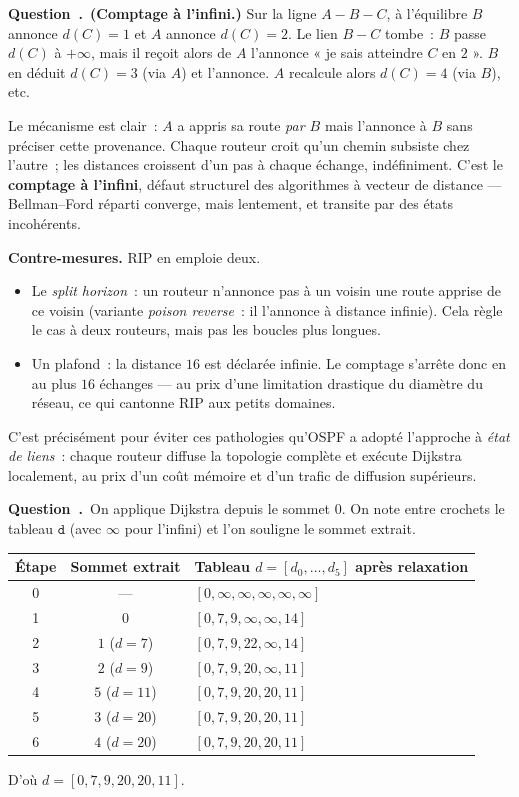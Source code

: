 \documentclass[11pt,a4paper]{article}
\renewcommand{\Q}{\medskip\par\stepcounter{qcnt}\noindent\textbf{\color{cnc}Question~\theqcnt.}~}
\begin{document}
\Q \textbf{(Comptage à l'infini.)} Sur la ligne $A - B - C$, à l'équilibre $B$ annonce
$d(C)=1$ et $A$ annonce $d(C)=2$. Le lien $B-C$ tombe~: $B$ passe $d(C)$ à $+\infty$, mais il
reçoit alors de $A$ l'annonce « je sais atteindre $C$ en $2$ ». $B$ en déduit $d(C)=3$ (via
$A$) et l'annonce. $A$ recalcule alors $d(C)=4$ (via $B$), etc.

Le mécanisme est clair~: $A$ a appris sa route \emph{par $B$} mais l'annonce à $B$ sans
préciser cette provenance. Chaque routeur croit qu'un chemin subsiste chez l'autre~; les
distances croissent d'un pas à chaque échange, indéfiniment. C'est le \textbf{comptage à
l'infini}, défaut structurel des algorithmes à vecteur de distance — Bellman--Ford réparti
converge, mais lentement, et transite par des états incohérents.

\textbf{Contre-mesures.} RIP en emploie deux.
\begin{itemize}[leftmargin=1.4em,itemsep=1pt]
\item Le \emph{split horizon}~: un routeur n'annonce pas à un voisin une route apprise de ce
voisin (variante \emph{poison reverse}~: il l'annonce à distance infinie). Cela règle le cas
à deux routeurs, mais pas les boucles plus longues.
\item Un plafond~: la distance $16$ est déclarée infinie. Le comptage s'arrête donc en au
plus $16$ échanges — au prix d'une limitation drastique du diamètre du réseau, ce qui
cantonne RIP aux petits domaines.
\end{itemize}
C'est précisément pour éviter ces pathologies qu'OSPF a adopté l'approche à \emph{état de
liens}~: chaque routeur diffuse la topologie complète et exécute Dijkstra localement, au prix
d'un coût mémoire et d'un trafic de diffusion supérieurs.

\Q On applique Dijkstra depuis le sommet $0$. On note entre crochets le tableau
$\texttt{d}$ (avec $\infty$ pour l'infini) et l'on souligne le sommet extrait.

\begin{center}\small
\begin{tabular}{c|c|l}
Étape & Sommet extrait & Tableau $d=[d_0,\dots,d_5]$ après relaxation\\\hline
0 & --- & $[0,\infty,\infty,\infty,\infty,\infty]$\\
1 & $0$ & $[0,7,9,\infty,\infty,14]$\\
2 & $1$ ($d=7$) & $[0,7,9,22,\infty,14]$\\
3 & $2$ ($d=9$) & $[0,7,9,20,\infty,11]$\\
4 & $5$ ($d=11$) & $[0,7,9,20,20,11]$\\
5 & $3$ ($d=20$) & $[0,7,9,20,20,11]$\\
6 & $4$ ($d=20$) & $[0,7,9,20,20,11]$
\end{tabular}
\end{center}
D'où $\boxed{d=[0,7,9,20,20,11]}$.
\end{document}
